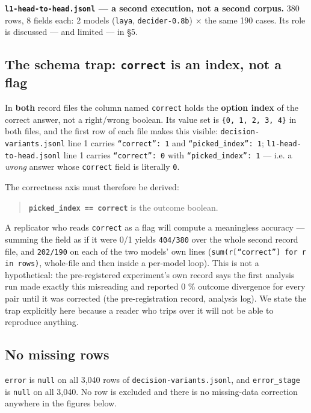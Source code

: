 \documentclass[11pt,a4paper]{article}
\begin{document}
\textbf{\texttt{l1-head-to-head.jsonl} --- a second execution, not a second corpus.} 380 rows, 8 fields each: 2 models (\texttt{laya}, \texttt{decider-0.8b}) $\times$ the same 190 cases. Its role is discussed --- and limited --- in \S5.

\subsection{The schema trap: \texttt{correct} is an index, not a flag}

In \textbf{both} record files the column named \texttt{correct} holds the \textbf{option index} of the correct answer, not a right/wrong boolean. Its value set is \texttt{\{0, 1, 2, 3, 4\}} in both files, and the first row of each file makes this visible: \texttt{decision-variants.jsonl} line 1 carries \texttt{``correct'': 1} and \texttt{``picked\_index'': 1}; \texttt{l1-head-to-head.jsonl} line 1 carries \texttt{``correct'': 0} with \texttt{``picked\_index'': 1} --- i.e. a \emph{wrong} answer whose \texttt{correct} field is literally \texttt{0}.

The correctness axis must therefore be derived:

\begin{quote}
\textbf{\texttt{picked\_index == correct}} is the outcome boolean.
\end{quote}

A replicator who reads \texttt{correct} as a flag will compute a meaningless accuracy --- summing the field as if it were 0/1 yields \texttt{404/380} over the whole second record file, and \texttt{202/190} on each of the two models' own lines (\texttt{sum(r[``correct''] for r in rows)}, whole-file and then inside a per-model loop). This is not a hypothetical: the pre-registered experiment's own record says the first analysis run made exactly this misreading and reported 0 \% outcome divergence for every pair until it was corrected (the pre-registration record, analysis log). We state the trap explicitly here because a reader who trips over it will not be able to reproduce anything.

\subsection{No missing rows}

\texttt{error} is \texttt{null} on all 3,040 rows of \texttt{decision-variants.jsonl}, and \texttt{error\_stage} is \texttt{null} on all 3,040. No row is excluded and there is no missing-data correction anywhere in the figures below.
\end{document}
